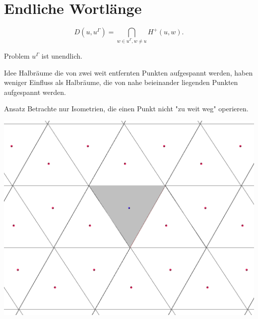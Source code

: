 \documentclass{beamer}
\theoremstyle{plain}
\newcommand{\T}{\mathcal{T}}
\begin{document}
\section{Endliche Wortlänge}

\begin{frame}
    $$
        D(u, u^\Gamma) = \bigcap_{w \in u^\Gamma, w \neq u} H^+(u, w).
    $$ 
    \begin{alertblock}{Problem}
        $u^\Gamma$ ist unendlich.
    \end{alertblock}
\end{frame}

\begin{frame}
    \begin{block}{Idee}
        Halbräume die von zwei weit entfernten Punkten aufgespannt werden, haben weniger Einfluss als Halbräume, die von nahe beieinander liegenden Punkten aufgespannt werden.
    \end{block}
    \pause
    \begin{block}{Ansatz}
        Betrachte nur Isometrien, die einen Punkt nicht "zu weit weg" operieren.
    \end{block}
\end{frame}



\begin{frame}
    \centering
    \includegraphics[width=\textwidth]{images/p2-hex-dirichlet.png}
\end{frame}
\end{document}
